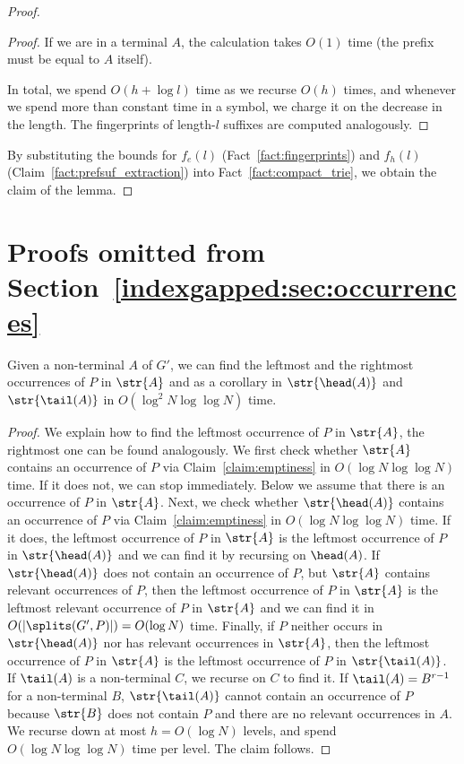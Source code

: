 \begin{proof}
\begin{proof}
If we are in a terminal $A$, the calculation takes $O(1)$ time (the prefix must be equal to $A$ itself). 
 
In total, we spend $O(h+\log l)$ time as we recurse $O(h)$ times, and whenever we spend more than constant time in a symbol, we charge it on the decrease in the length. The fingerprints of length-$l$ suffixes are computed analogously.
\end{proof}


By substituting the bounds for $f_e(l)$ (Fact~\ref{fact:fingerprints}) and $f_h(l)$ (Claim~\ref{fact:prefsuf_extraction}) into Fact~\ref{fact:compact_trie}, we obtain the claim of the lemma.
\end{proof}

\section{Proofs omitted from Section~\ref{indexgapped:sec:occurrences}}
\label{app:occurrences}
\begin{claim}\label{claim:leftmost_rightmost}
Given a non-terminal $A$ of $G'$, we can find the leftmost and the rightmost occurrences of $P$ in $\str{A}$ and as a corollary in $\str{\head(A)}$ and $\str{\tail(A)}$ in $O(\log^{2} N\log\log N)$ time.  %
\end{claim}
\begin{proof}
We explain how to find the leftmost occurrence of $P$ in $\str{A}$, the rightmost one can be found analogously. We first check whether $\str{A}$ contains an occurrence of $P$ via Claim~\ref{claim:emptiness} in $O(\log N\log \log N)$ time. If it does not, we can stop immediately. Below we assume that there is an occurrence of $P$ in  $\str{A}$. Next, we check whether $\str{\head(A)}$ contains an occurrence of $P$ via Claim~\ref{claim:emptiness} in $O(\log N\log \log N)$ time. If it does, the leftmost occurrence of $P$ in $\str{A}$ is the leftmost occurrence of $P$ in $\str{\head(A)}$ and we can find it by recursing on $\head(A)$. If $\str{\head(A)}$ does not contain an occurrence of $P$, but $\str{A}$ contains relevant occurrences of $P$, then the leftmost occurrence of $P$ in $\str{A}$ is the leftmost relevant occurrence of $P$ in $\str{A}$ and we can find it in $O(|\splits(G',P)|) = O(\log N)$ time. Finally, if $P$ neither occurs in $\str{\head(A)}$ nor has relevant occurrences in $\str{A}$, then the leftmost occurrence of $P$ in $\str{A}$ is the leftmost occurrence of $P$ in $\str{\tail(A)}$. If $\tail(A)$ is a non-terminal $C$, we recurse on $C$ to find it. If $\tail(A)=B^{r-1}$ for a non-terminal $B$, $\str{\tail(A)}$ cannot contain an occurrence of $P$ because $\str{B}$ does not contain $P$ and there are no relevant occurrences in $A$. We recurse down at most $h = O(\log N)$ levels, and spend $O(\log N\log \log N)$ time per level. The claim follows.
\end{proof}

